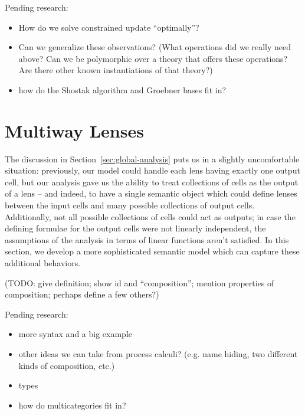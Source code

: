 \documentclass{article}
\begin{document}
Pending research:
\begin{itemize}
    \item How do we solve constrained update ``optimally''?
    \item Can we generalize these observations? (What operations did we
        really need above? Can we be polymorphic over a theory that offers
        these operations? Are there other known instantiations of that
        theory?)
    \item how do the Shostak algorithm and Groebner bases fit in?
\end{itemize}
\section{Multiway Lenses}
\label{sec:multiway}
The discussion in Section~\ref{sec:global-analysis} puts us in a slightly
uncomfortable situation: previously, our model could handle each lens having
exactly one output cell, but our analysis gave us the ability to treat
collections of cells as the output of a lens -- and indeed, to have a single
semantic object which could define lenses between the input cells and many
possible collections of output cells. Additionally, not all possible
collections of cells could act as outputs; in case the defining formulae for
the output cells were not linearly independent, the assumptions of the
analysis in terms of linear functions aren't satisfied. In this section, we
develop a more sophisticated semantic model which can capture these
additional behaviors. %

(TODO: give definition; show id and ``composition''; mention properties of
composition; perhaps define a few others?)

Pending research:
\begin{itemize}
    \item more syntax and a big example
    \item other ideas we can take from process calculi? (e.g. name hiding,
        two different kinds of composition, etc.)
    \item types
    \item how do multicategories fit in?
\end{itemize}
\end{document}

